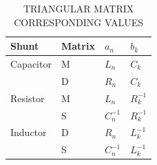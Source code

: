 \documentclass[a4paper, 10pt, twoside, twocolumn]{scrartcl}
\begin{document}
\begin{table}[b]
	\renewcommand{\arraystretch}{1.3}
	\centering
	\caption{\MakeUppercase{Triangular Matrix Corresponding Values}}
	\begin{tabular}{l l l l}
		\toprule
		Shunt & Matrix & $a_{n}$ & $b_{k}$ \\
		\midrule
		Capacitor & M & $L_{n}$ & $C_{k}$	\\
		& D & $R_{n}$ & $C_{k}$ \\[1.5ex] 
		Resistor & M & $L_{n}$ & $R_{k}^{-1}$ \\ 
		& S & $C_{n}^{-1}$ & $R_{k}^{-1}$ \\[1.5ex] 
		Inductor & D & $R_{n}$ & $L_{k}^{-1}$ \\
		& S & $C_{n}^{-1}$ & $L_{k}^{-1}$ \\ 
		\bottomrule
	\end{tabular}
	\label{table:triangular_matrix_values}
\end{table}
\end{document}
